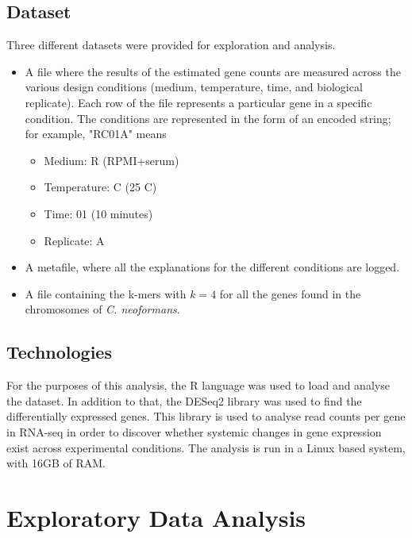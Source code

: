 \documentclass[11pt,twoside]{article}
\numberwithin{Theorem}{section}
\numberwithin{Definition}{section}
\numberwithin{Lemma}{section}
\numberwithin{Algorithm}{section}
\numberwithin{equation}{section}
\begin{document}
\subsection{Dataset}
\label{sec:data}

Three different datasets were provided for exploration and analysis. 
\begin{itemize}
\item A file where the results of the estimated gene counts are measured across the various design conditions (medium, temperature, time, and biological replicate). Each row of the file represents a particular gene in a specific condition. The conditions are represented in the form of an encoded string; for example, "RC01A" means 
\begin{itemize}
\item Medium: R (RPMI+serum)
\item Temperature: C (25 C)
\item Time: 01 (10 minutes)
\item Replicate: A

\end{itemize}
\item A metafile, where all the explanations for the different conditions are logged.
\item A file containing the k-mers with $k=4$ for all the genes found in the chromosomes of \emph{C. neoformans}.
\end{itemize}

\subsection{Technologies}
\label{sec:technologies}

For the purposes of this analysis, the \textsf{R} language was used to load and analyse the dataset. In addition to that, the \textsf{DESeq2} library \cite{love2014moderated} was used to find the differentially expressed genes. This library is used to analyse read counts per gene in RNA-seq in order to discover whether systemic changes in gene expression exist across experimental conditions. The analysis is run in a \textsf{Linux} based system, with 16GB of RAM. 

\clearpage
\section{Exploratory Data Analysis}
\label{sec:eda}
\end{document}
